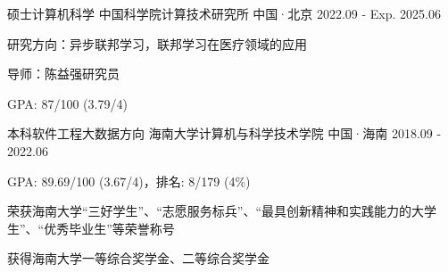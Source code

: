 

\begin{cventries}

\cventry
{硕士{\enskip\cdotp\enskip}计算机科学} %
{中国科学院{\enskip\cdotp\enskip}计算技术研究所} %
{中国·北京} %
{2022.09 - Exp. 2025.06} %
{
    \begin{cvitems} %
        \item {研究方向：异步联邦学习，联邦学习在医疗领域的应用}
        \item {导师：陈益强研究员}
        \item {GPA: 87/100 (3.79/4)}
    \end{cvitems}
}

\cventry
{本科{\enskip\cdotp\enskip}软件工程大数据方向} %
{海南大学{\enskip\cdotp\enskip}计算机与科学技术学院} %
{中国·海南} %
{2018.09 - 2022.06} %
{
    \begin{cvitems} %
        \item {GPA: 89.69/100 (3.67/4)，排名: 8/179 (4\%)}
        \item {荣获海南大学“三好学生”、“志愿服务标兵”、“最具创新精神和实践能力的大学生”、“优秀毕业生”等荣誉称号}
        \item {获得海南大学一等综合奖学金、二等综合奖学金}
    \end{cvitems}
}

\end{cventries}
